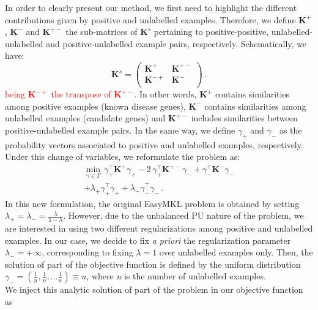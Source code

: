 In order to clearly present our method, we first need to highlight the different contributions given by positive and unlabelled examples. Therefore, we define $\textbf{K}^{+}$, $\textbf{K}^{-}$ and $\textbf{K}^{+-}$ the sub-matrices of $\textbf{K}^s$ pertaining to positive-positive, unlabelled-unlabelled and positive-unlabelled example pairs, respectively. Schematically, we have:
\begin{equation*}
\textbf{K}^{s} = \left( \begin{array}{cc}
\textbf{K}^{+} & \textbf{K}^{+-}\\
\textbf{K}^{-+} & \textbf{K}^{-}\\
\end{array} \right) \, .
\end{equation*}
\textcolor{red}{being $\textbf{K}^{-+}$ the transpose of $\textbf{K}^{+-}$.} In other words, $\textbf{K}^{+}$ contains similarities among positive examples (known disease genes), $\textbf{K}^{-}$ contains similarities among unlabelled examples (candidate genes) and $\textbf{K}^{+-}$ includes similarities between positive-unlabelled example pairs. In the same way, we define $\gamma_{+}$ and $\gamma_{-}$ as the probability vectors associated to positive and unlabelled examples, respectively.\\
Under this change of variables, we reformulate the problem as:
\begin{multline*}
	\min \limits_{\gamma \in \Gamma} \, \gamma_{+}^{\top} \textbf{K}^{+} \gamma_{+} - 2 \,\gamma_{+}^{\top} \textbf{K}^{+-} \gamma_{-} +  \gamma_{-}^{\top} \textbf{K}^{-} \gamma_{-} \\+ \lambda_{+} \gamma_{+}^{\top} \gamma_{+} + \lambda_{-} \gamma_{-}^{\top} \gamma_{-} \, .
\end{multline*}
In this new formulation, the original EasyMKL problem is obtained by setting $\lambda_+ = \lambda_- = \frac{\lambda}{1-\lambda}$. However, due to the unbalanced PU nature of the problem, we are interested in using two different regularizations among positive and unlabelled examples. In our case, we decide to fix \emph{a priori} the regularization parameter  $\lambda_{-} = +\infty$, corresponding to fixing $\lambda=1$ over unlabelled examples only. Then, the solution of part of the objective function is defined by the uniform distribution $\gamma_{-} = (\frac{1}{n},\frac{1}{n},\dots\frac{1}{n}) \equiv u$, where \textit{n} is the number of unlabelled examples.\\
We inject this analytic solution of part of the problem in our objective function as
